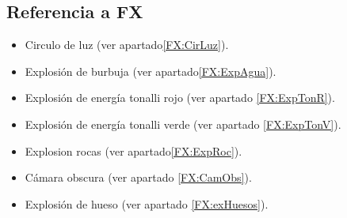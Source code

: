 	\subsection{Referencia a FX}
	\begin{itemize}
		\item Circulo de luz  (ver apartado\ref{FX:CirLuz}).
		\item Explosión de burbuja (ver apartado\ref{FX:ExpAgua}).
		\item Explosión de energía tonalli rojo (ver apartado \ref{FX:ExpTonR}).
		\item Explosión de energía tonalli verde (ver apartado \ref{FX:ExpTonV}).
		\item Explosion rocas  (ver apartado\ref{FX:ExpRoc}).
		\item Cámara obscura (ver apartado \ref{FX:CamObs}).
		\item Explosión de hueso (ver apartado \ref{FX:exHuesos}).
	\end{itemize}

